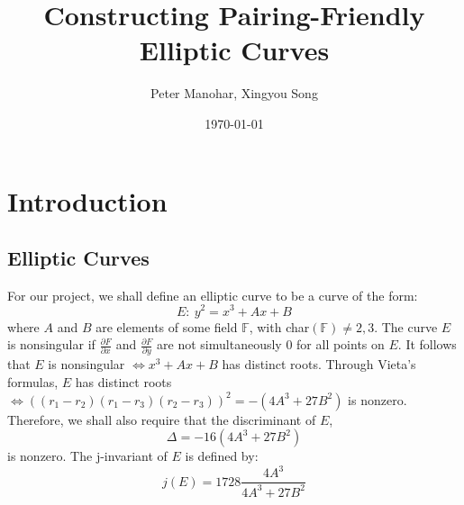 \documentclass[12pt,twoside]{article}
\title{Constructing Pairing-Friendly Elliptic Curves }
\date{\today}
\author{ Peter Manohar, Xingyou Song}
\begin{document}
\maketitle


\tableofcontents

\section{Introduction}



\subsection{Elliptic Curves} 
For our project, we shall define an elliptic curve to be a curve of the form:
\begin{equation}
E: \ y^2 = x^3 + Ax + B 
\end{equation}
where $A$ and $B$ are elements of some field $\mathbb F$, with char$(\mathbb F) \ne 2,3$. The curve $E$ is nonsingular if $\frac{\partial F}{\partial x}$ and $\frac{\partial F}{\partial y}$ are not simultaneously $0$ for all points on $E$. It follows that $E$ is nonsingular $\iff x^3+ Ax+ B$ has distinct roots. Through Vieta's formulas, $E$ has distinct roots $\iff ((r_{1} - r_{2})(r_{1} - r_{3})(r_{2} - r_{3}))^{2} = -(4A^{3} + 27B^{2})$ is nonzero. Therefore, we shall also require that the discriminant of $E$,
\begin{equation} 
\Delta = -16(4A^{3} + 27B^{2})
\end{equation}
is nonzero. 
The j-invariant of $E$ is defined by:
\begin{equation}
j(E) = 1728 \frac{4A^{3}}{4A^{3} + 27B^{2}}
\end{equation}
\end{document}
